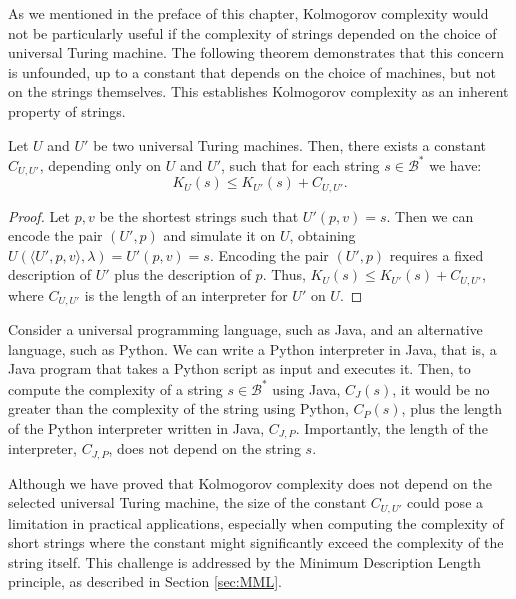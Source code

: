As we mentioned in the preface of this chapter, Kolmogorov complexity would not be particularly useful if the complexity of strings depended on the choice of universal Turing machine. The following theorem demonstrates that this concern is unfounded, up to a constant that depends on the choice of machines, but not on the strings themselves. This establishes Kolmogorov complexity as an inherent property of strings.

\begin{theorem}
\label{def:Invariance-theorem}
Let $U$ and $U'$ be two universal Turing machines. Then, there exists a constant $C_{U, U'}$, depending only on $U$ and $U'$, such that for each string $s \in \mathcal{B}^{\ast}$ we have:
\[
K_{U}(s) \leq K_{U'}(s) + C_{U, U'}.
\]
\end{theorem}
\begin{proof}
Let $p, v$ be the shortest strings such that $U'(p,v)=s$. Then we can encode the pair $(U',p)$ and simulate it on $U$, obtaining $U(\langle U',p,v \rangle,\lambda) = U'(p,v) = s$. Encoding the pair $(U',p)$ requires a fixed description of $U'$ plus the description of $p$. Thus, $K_U(s) \leq K_{U'}(s) + C_{U,U'}$, where $C_{U,U'}$ is the length of an interpreter for $U'$ on $U$.
\end{proof}

\begin{example}
Consider a universal programming language, such as Java, and an alternative language, such as Python. We can write a Python interpreter in Java, that is, a Java program that takes a Python script as input and executes it. Then, to compute the complexity of a string $s \in \mathcal{B}^\ast$ using Java, $C_J(s)$, it would be no greater than the complexity of the string using Python, $C_P(s)$, plus the length of the Python interpreter written in Java, $C_{J,P}$. Importantly, the length of the interpreter, $C_{J,P}$, does not depend on the string $s$.
\end{example}

Although we have proved that Kolmogorov complexity does not depend on the selected universal Turing machine, the size of the constant \(C_{U, U'}\) could pose a limitation in practical applications, especially when computing the complexity of short strings where the constant might significantly exceed the complexity of the string itself. This challenge is addressed by the Minimum Description Length principle, as described in Section \ref{sec:MML}.

